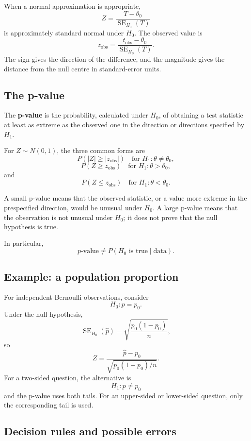 When a normal approximation is appropriate,
\[
Z=\frac{T-\theta_0}{\operatorname{SE}_{H_0}(T)}
\]
is approximately standard normal under \(H_0\). The observed value is
\[
z_{\mathrm{obs}}
=
\frac{t_{\mathrm{obs}}-\theta_0}{\operatorname{SE}_{H_0}(T)}.
\]
The sign gives the direction of the difference, and the magnitude gives the
distance from the null centre in standard-error units.

\subsection*{The p-value}

\begin{definitionbox}
The \textbf{p-value} is the probability, calculated under \(H_0\), of obtaining a
test statistic at least as extreme as the observed one in the direction or
directions specified by \(H_1\).
\end{definitionbox}

For \(Z\sim N(0,1)\), the three common forms are
\[
P(|Z|\geq|z_{\mathrm{obs}}|)
\quad\text{for }H_1:\theta\neq\theta_0,
\]
\[
P(Z\geq z_{\mathrm{obs}})
\quad\text{for }H_1:\theta>\theta_0,
\]
and
\[
P(Z\leq z_{\mathrm{obs}})
\quad\text{for }H_1:\theta<\theta_0.
\]

A small p-value means that the observed statistic, or a value more extreme in the
prespecified direction, would be unusual under \(H_0\). A large p-value means
that the observation is not unusual under \(H_0\); it does not prove that the
null hypothesis is true.

In particular,
\[
p\text{-value}\neq P(H_0\text{ is true}\mid\text{data}).
\]

\subsection*{Example: a population proportion}

For independent Bernoulli observations, consider
\[
H_0:p=p_0.
\]
Under the null hypothesis,
\[
\operatorname{SE}_{H_0}(\widehat p)
=
\sqrt{\frac{p_0(1-p_0)}{n}},
\]
so
\[
Z=
\frac{\widehat p-p_0}{\sqrt{p_0(1-p_0)/n}}.
\]
For a two-sided question, the alternative is
\[
H_1:p\neq p_0
\]
and the p-value uses both tails. For an upper-sided or lower-sided question, only
the corresponding tail is used.

\subsection*{Decision rules and possible errors}

